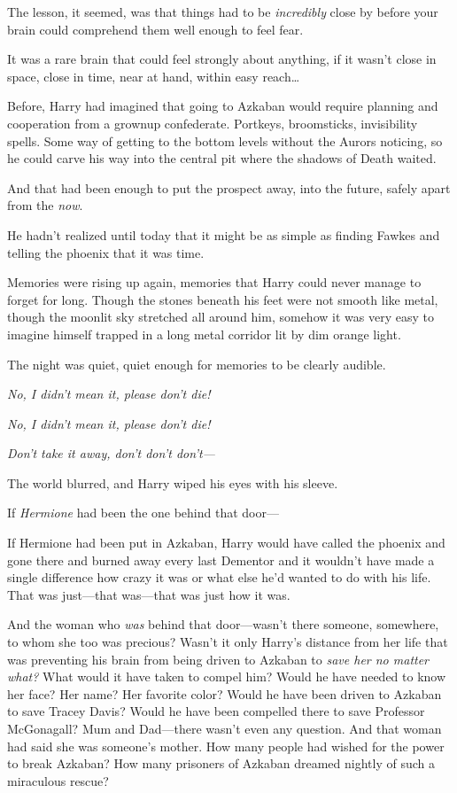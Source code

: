 The lesson, it seemed, was that things had to be \emph{incredibly} close by 
before your brain could comprehend them well enough to feel fear.

It was a rare brain that could feel strongly about anything, if it wasn't close 
in space, close in time, near at hand, within easy reach{\ldots}

Before, Harry had imagined that going to Azkaban would require planning and 
cooperation from a grownup confederate. Portkeys, broomsticks, invisibility 
spells. Some way of getting to the bottom levels without the Aurors noticing, 
so he could carve his way into the central pit where the shadows of Death 
waited.

And that had been enough to put the prospect away, into the future, safely 
apart from the \emph{now}.

He hadn't realized until today that it might be as simple as finding Fawkes and 
telling the phoenix that it was time.

Memories were rising up again, memories that Harry could never manage to forget 
for long. Though the stones beneath his feet were not smooth like metal, though 
the moonlit sky stretched all around him, somehow it was very easy to imagine 
himself trapped in a long metal corridor lit by dim orange light.

The night was quiet, quiet enough for memories to be clearly audible.

\emph{No, I didn't mean it, please don't die!}

\emph{No, I didn't mean it, please don't die!}

\emph{Don't take it away, don't don't don't---}

The world blurred, and Harry wiped his eyes with his sleeve.

If \emph{Hermione} had been the one behind that door---

If Hermione had been put in Azkaban, Harry would have called the phoenix and 
gone there and burned away every last Dementor and it wouldn't have made a 
single difference how crazy it was or what else he'd wanted to do with his 
life. That was just---that was---that was just how it was.

And the woman who \emph{was} behind that door---wasn't there someone, 
somewhere, to whom she too was precious? Wasn't it only Harry's distance from 
her life that was preventing his brain from being driven to Azkaban to 
\emph{save her no matter what?} What would it have taken to compel him? Would 
he have needed to know her face? Her name? Her favorite color? Would he have 
been driven to Azkaban to save Tracey Davis? Would he have been compelled there 
to save Professor McGonagall? Mum and Dad---there wasn't even any question. And 
that woman had said she was someone's mother. How many people had wished for 
the power to break Azkaban? How many prisoners of Azkaban dreamed nightly of 
such a miraculous rescue?

